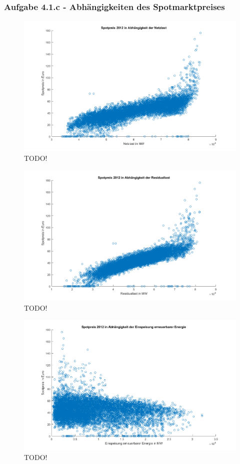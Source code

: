\documentclass[a4paper,12pt]{article}
\begin{document}
	\subsubsection{Aufgabe 4.1.c - Abhängigkeiten des Spotmarktpreises}
	\begin{figure}[H]
		\centering
		\includegraphics[width=12cm]{img/results/ScatterNetzlast}
		\caption{TODO!}
	\end{figure}
	\begin{figure}[H]
		\centering
		\includegraphics[width=12cm]{img/results/ScatterResiduallast}
		\caption{TODO!}
	\end{figure}
	\begin{figure}[H]
		\centering
		\includegraphics[width=12cm]{img/results/ScatterEinspeisung}
		\caption{TODO!}
	\end{figure}
\end{document}
